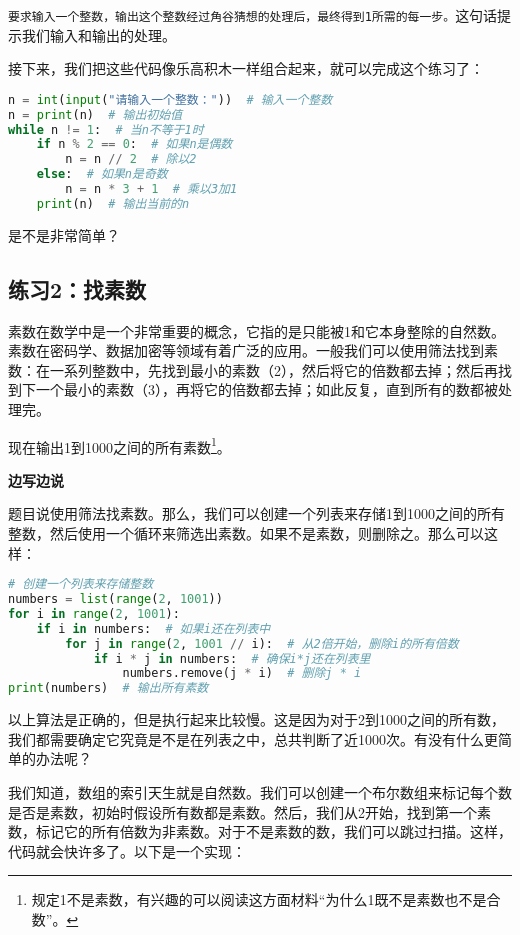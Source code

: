 \documentclass[../main.tex]{subfiles}
\begin{document}
\texttt{要求输入一个整数，输出这个整数经过角谷猜想的处理后，最终得到1所需的每一步。}这句话提示我们输入和输出的处理。

接下来，我们把这些代码像乐高积木一样组合起来，就可以完成这个练习了：
\begin{lstlisting}[language=python]
n = int(input("请输入一个整数："))  # 输入一个整数
n = print(n)  # 输出初始值
while n != 1:  # 当n不等于1时
    if n % 2 == 0:  # 如果n是偶数
        n = n // 2  # 除以2
    else:  # 如果n是奇数
        n = n * 3 + 1  # 乘以3加1
    print(n)  # 输出当前的n
\end{lstlisting}

是不是非常简单？

\subsection{练习2：找素数}

素数在数学中是一个非常重要的概念，它指的是只能被1和它本身整除的自然数。素数在密码学、数据加密等领域有着广泛的应用。一般我们可以使用筛法找到素数：在一系列整数中，先找到最小的素数（2），然后将它的倍数都去掉；然后再找到下一个最小的素数（3），再将它的倍数都去掉；如此反复，直到所有的数都被处理完。

现在输出1到1000之间的所有素数\footnote{规定1不是素数，有兴趣的可以阅读这方面材料“为什么1既不是素数也不是合数”。}。

\textbf{边写边说}

题目说使用筛法找素数。那么，我们可以创建一个列表来存储1到1000之间的所有整数，然后使用一个循环来筛选出素数。如果不是素数，则删除之。那么可以这样：

\begin{lstlisting}[language=python]
# 创建一个列表来存储整数
numbers = list(range(2, 1001))
for i in range(2, 1001):
    if i in numbers:  # 如果i还在列表中
        for j in range(2, 1001 // i):  # 从2倍开始，删除i的所有倍数
            if i * j in numbers:  # 确保i*j还在列表里
                numbers.remove(j * i)  # 删除j * i
print(numbers)  # 输出所有素数
\end{lstlisting}

以上算法是正确的，但是执行起来比较慢。这是因为对于2到1000之间的所有数，我们都需要确定它究竟是不是在列表之中，总共判断了近1000次。有没有什么更简单的办法呢？

我们知道，数组的索引天生就是自然数。我们可以创建一个布尔数组来标记每个数是否是素数，初始时假设所有数都是素数。然后，我们从2开始，找到第一个素数，标记它的所有倍数为非素数。对于不是素数的数，我们可以跳过扫描。这样，代码就会快许多了。以下是一个实现：
\end{document}
